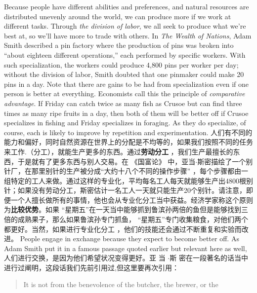 \begin{paracol}{2}
Because people have different abilities and preferences, and natural resources are distributed unevenly around the world, we
can produce more if we work at different tasks. Through \textit{the division of labor}, we all seek to produce what we're best at, so we'll
have more to trade with others. In \textit{The Wealth of Nations}, Adam
Smith described a pin factory where the production of pins was
broken into ``about eighteen different operations,'' each performed by specific workers. With such specialization, the workers could produce 4,800 pins per worker per day; without the
division of labor, Smith doubted that one pinmaker could make
20 pins in a day. Note that there are gains to be had from specialization even if one person is better at everything. Economists call this the principle of \textit{comparative advantage}. If Friday
can catch twice as many fish as Crusoe but can find three times
as many ripe fruits in a day, then both of them will be better off
if Crusoe specializes in fishing and Friday specializes in foraging.
As they do specialize, of course, each is likely to improve by repetition and experimentation.
\switchcolumn
人们有不同的能力和偏好，同时自然资源在世界上的分配是不均等的，如果我们按照不同的任务来工作.（分工），就能生产更多的东西。通过\textbf{劳动分工} ，我们生产最擅长的东西，于是就有了更多东西与别人交易。在 《国富论》 中，亚当$\cdot$斯密描绘了一个别针厂，在那里别针的生产被分成“大约十八个不同的操作步骤” ，每个步骤都由一组特定的工人来做。通过这样的专业化，平均每名工人每天就能够生产出4800根别针；如果没有劳动分工，斯密估计一名工人一天就只能生产20个别针。请注意，即便一个人擅长做所有的事情，他也会从专业化分工当中获益。经济学家称这个原则为\textbf{比较优势}。如果 “星期五”在一天当中能够抓到鲁滨孙两倍的鱼但是能够找到三倍的成熟果子，那么如果鲁滨孙专门抓鱼， “星期五”专门收集粮食，对他们两个都更好。当然，如果进行专业化分工 ，他们的技能还会通过不断重复和实验而改进。
\switchcolumn*
People engage in exchange because they expect to become
better off. As Adam Smith put it in a famous passage quoted
earlier but relevant here as well,
\switchcolumn
人们进行交换，是因为他们希望状况变得更好。亚 当 $\cdot$斯
密在一段著名的话当中进行过阐明，这段话我们先前引用过,但这里要再次引用：
\switchcolumn*
\begin{quote}
It is not from the benevolence of the butcher, the brewer, or the

\end{quote}
\end{paracol}
